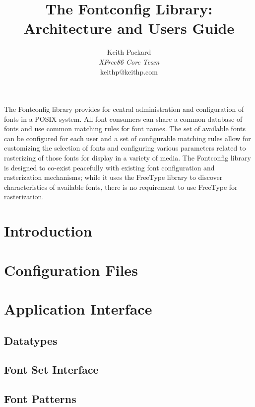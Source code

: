 \documentclass[10pt]{article}
\begin{document}
\date{}
\title{The Fontconfig Library:\\
Architecture and Users Guide}
\author{Keith Packard\\
{\em XFree86 Core Team}\\
keithp@keithp.com}
\maketitle
\thispagestyle{empty}

\abstract

The Fontconfig library provides for central administration and configuration
of fonts in a POSIX system.  All font consumers can share a common database
of fonts and use common matching rules for font names.  The set of available
fonts can be configured for each user and a set of configurable matching
rules allow for customizing the selection of fonts and configuring various
parameters related to rasterizing of those fonts for display in a variety of
media.  The Fontconfig library is designed to co-exist peacefully with
existing font configuration and rasterization mechanisms; while it uses the
FreeType library to discover characteristics of available fonts, there
is no requirement to use FreeType for rasterization.

\section				{Introduction}

\section				{Configuration Files}

\section				{Application Interface}

\subsection				{Datatypes}

\subsection				{Font Set Interface}

\subsection				{Font Patterns}
\end{document}
